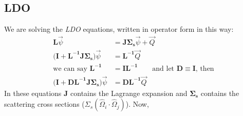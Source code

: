 \documentclass[12pt,twoside]{article}
\newcommand{\ve}[1]{\ensuremath{\mathbf{#1}}}
\begin{document}
\subsection*{LDO}
We are solving the \textit{LDO} equations, written in operator form in this way:
%
\begin{align}
\ve{L}\vec{\psi} &= \ve{J \Sigma_s}\vec{\psi} + \vec{Q}\\
\bigl(\ve{I} + \ve{L^{-1} J \Sigma_s}\bigr)\vec{\psi} &= \ve{L^{-1}}\vec{Q} \nonumber \\ 
\text{we can say }\ve{L^{-1}} &= \ve{I}\ve{L^{-1}} \qquad \text{and let } \ve{D} \equiv \ve{I} \text{, then} \nonumber\\
\bigl(\ve{I} + \ve{D L^{-1} J \Sigma_s}\bigr)\vec{\psi} &= \ve{D L^{-1}}\vec{Q}
\end{align}
% 
In these equations $\ve{J}$ contains the Lagrange expansion and $\ve{\Sigma_s}$ contains the scattering cross sections ($\Sigma_s(\hat{\Omega}_i \cdot \hat{\Omega}_j)$).
%
Now, 
\end{document}
